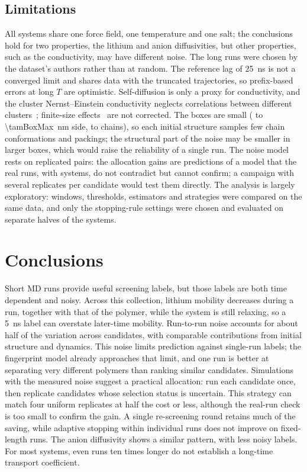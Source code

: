 \documentclass[journal=jcisd8,manuscript=article,email=true]{achemso}
\begin{document}
\subsection{Limitations}\label{sec:limitations}
All systems share one force field, one temperature and one salt; the conclusions hold for two
properties, the lithium and anion diffusivities, but other properties, such as the conductivity,
may have different noise. The long runs were chosen by
the dataset's authors rather than at random. The reference lag of \SI{25}{\nano\second} is not a
converged limit and shares data with the truncated trajectories, so prefix-based errors at long
$T$ are optimistic. Self-diffusion is only a proxy for conductivity, and the cluster Nernst--Einstein conductivity
neglects correlations between different clusters~\cite{FranceLanord2019NernstEinstein}; finite-size
effects~\cite{Yeh2004SystemSize} are not corrected. The boxes are small (\tamBoxMin{} to
\SI{\tamBoxMax}{\nano\metre} side, \tamChainsMin{} to \tamChainsMax{} chains), so each
initial structure samples few chain conformations and packings; the structural part of the noise
may be smaller in larger boxes, which would raise the reliability of a single run. The noise model rests on \nRep{} replicated
pairs: the allocation gains are predictions of a model that the real runs, with \valAlNCamp{} systems,
do not contradict but cannot confirm; a campaign with several replicates per candidate would test
them directly. The analysis is largely exploratory: windows, thresholds, estimators and strategies
were compared on the same data, and only the stopping-rule settings were chosen and evaluated on
separate halves of the systems.

\section{Conclusions}\label{sec:conclusion}
Short MD runs provide useful screening labels, but those labels are both time dependent and noisy.
Across this collection, lithium mobility decreases during a run, together with that of the
polymer, while the system is still relaxing, so a \SI{5}{\nano\second} label
can overstate later-time mobility. Run-to-run noise accounts for about half of the variation
across candidates, with comparable contributions from initial structure and dynamics. This noise
limits prediction against single-run labels; the fingerprint model already approaches that limit,
and one run is better at separating very different polymers than ranking similar candidates.
Simulations with the measured noise suggest a practical allocation: run each candidate once, then
replicate candidates whose selection status is uncertain. This strategy can match four uniform
replicates at half the cost or less, although the real-run check is too small to confirm the gain.
A single re-screening round retains much of the saving, while adaptive stopping within individual
runs does not improve on fixed-length runs. The anion diffusivity shows a similar pattern, with
less noisy labels. For most systems, even runs ten times longer do not establish a long-time
transport coefficient.
\end{document}
